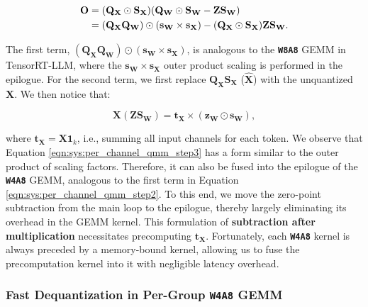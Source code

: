 \vspace{-20pt}
\begin{equation}
\begin{aligned}
\small \mathbf{O} &= (\mathbf{Q}_\mathbf{X}\odot\mathbf{S}_\mathbf{X})(\mathbf{Q}_\mathbf{W}\odot\mathbf{S}_\mathbf{W}-\mathbf{ZS}_\mathbf{W}) \\
\small &= (\mathbf{Q}_\mathbf{X}\mathbf{Q}_\mathbf{W})\odot(\mathbf{s}_\mathbf{W}\times\mathbf{s}_\mathbf{X}) - (\mathbf{Q}_\mathbf{X}\odot\mathbf{S}_\mathbf{X})\mathbf{ZS}_\mathbf{W}.  
\label{eqn:sys:per_channel_qmm_step2}
\end{aligned}
\end{equation}

The first term, $(\mathbf{Q}_\mathbf{X}\mathbf{Q}_\mathbf{W})\odot(\mathbf{s}_\mathbf{W}\times\mathbf{s}_\mathbf{X})$, is analogous to the \textbf{\texttt{W8A8}} GEMM in TensorRT-LLM, where the $\mathbf{s}_\mathbf{W}\times\mathbf{s}_\mathbf{X}$ outer product scaling is performed in the epilogue. For the second term, we first replace $\mathbf{Q}_\mathbf{X}\mathbf{S}_\mathbf{X}$  ($\hat{\mathbf{X}}$) with the unquantized $\mathbf{X}$. We then notice that:


\vspace{-14pt}
\begin{equation}
\mathbf{X}(\mathbf{ZS}_\mathbf{W}) = \mathbf{t}_\mathbf{X}\times(\mathbf{z}_\mathbf{W}\odot\mathbf{s}_\mathbf{W}),
\label{eqn:sys:per_channel_qmm_step3}
\end{equation}
\vspace{-18pt}

where $\mathbf{t}_\mathbf{X} = \mathbf{X}\mathbf{1}_k$, i.e., summing all input channels for each token. We observe that Equation \ref{eqn:sys:per_channel_qmm_step3} has a form similar to the outer product of scaling factors. Therefore, it can also be fused into the epilogue of the \textbf{\texttt{W4A8}} GEMM, analogous to the first term in Equation \ref{eqn:sys:per_channel_qmm_step2}. To this end, we move the zero-point subtraction from the main loop to the epilogue, thereby largely eliminating its overhead in the GEMM kernel. This formulation of \textbf{subtraction after multiplication} necessitates precomputing $\mathbf{t}_\mathbf{X}$. Fortunately, each \textbf{\texttt{W4A8}} kernel is always preceded by a memory-bound kernel, allowing us to fuse the precomputation kernel into it with negligible latency overhead.

\subsubsection{Fast Dequantization in Per-Group \textbf{\texttt{W4A8}} GEMM} 


